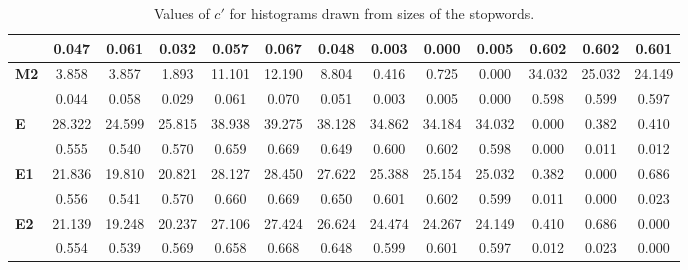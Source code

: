 \begin{table*}[h!]
\begin{center}
\begin{tabular}{| l || c | c | c || c | c | c || c | c | c || c | c | c |}
 & 0.047  & 0.061  & 0.032  & 0.057  & 0.067  & 0.048  & 0.003  & 0.000  & 0.005  & 0.602  & 0.602  & 0.601 \\\hline
{\bf M2} & 3.858 & 3.857 & 1.893 & 11.101 & 12.190 & 8.804 & 0.416 & 0.725 & 0.000 & 34.032 & 25.032 & 24.149 \\
 & 0.044  & 0.058  & 0.029  & 0.061  & 0.070  & 0.051  & 0.003  & 0.005  & 0.000  & 0.598  & 0.599  & 0.597 \\\hline\hline
{\bf E} & 28.322 & 24.599 & 25.815 & 38.938 & 39.275 & 38.128 & 34.862 & 34.184 & 34.032 & 0.000 & 0.382 & 0.410 \\
 & 0.555  & 0.540  & 0.570  & 0.659  & 0.669  & 0.649  & 0.600  & 0.602  & 0.598  & 0.000  & 0.011  & 0.012 \\\hline
{\bf E1} & 21.836 & 19.810 & 20.821 & 28.127 & 28.450 & 27.622 & 25.388 & 25.154 & 25.032 & 0.382 & 0.000 & 0.686 \\
 & 0.556  & 0.541  & 0.570  & 0.660  & 0.669  & 0.650  & 0.601  & 0.602  & 0.599  & 0.011  & 0.000  & 0.023 \\\hline
{\bf E2} & 21.139 & 19.248 & 20.237 & 27.106 & 27.424 & 26.624 & 24.474 & 24.267 & 24.149 & 0.410 & 0.686 & 0.000 \\
 & 0.554  & 0.539  & 0.569  & 0.658  & 0.668  & 0.648  & 0.599  & 0.601  & 0.597  & 0.012  & 0.023  & 0.000 \\\hline
\end{tabular}
\caption{Values of $c'$ for histograms drawn from sizes of the stopwords.}
\end{center}
\end{table*}